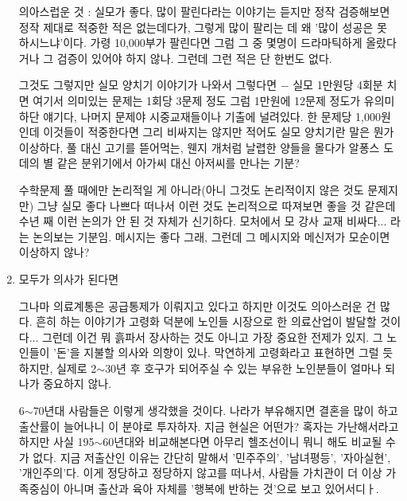 \begin{enumerate}
    의아스럽운 것 : 실모가 좋다, 많이 팔린다라는 이야기는 듣지만
    정작 검증해보면 정작 제대로 적중한 적은 없는데다가, 그렇게 많이 팔리는 데 왜 '많이 성공은 못 하시느냐'이다.
    가령 10,000부가 팔린다면 그럼 그 중 몇명이 드라마틱하게 올랐다거나 그 검증이 있어야 하지 않나. 그런데 그런 적은 단 한번도 없다.
    \vspace{5mm}

    그것도 그렇지만 실모 양치기 이야기가 나와서 그렇다면 $-$ 실모 1만원당 4회분 치면 여기서 의미있는 문제는 1회당 3문제 정도
    그럼 1만원에 12문제 정도가 유의미하단 얘기다, 나머지 문제야 시중교재들이나 기출에 널려있다.
    한 문제당 1,000원인데 이것들이 적중한다면 그리 비싸지는 않지만 적어도 실모 양치기란 말은 뭔가 이상하다,
    풀 대신 고기를 뜯어먹는, 웬지 개처럼 날렵한 양들을 몰다가 알퐁스 도데의 별 같은 분위기에서 아가씨 대신 아저씨를 만나는 기분?
    \vspace{5mm}

    수학문제 풀 때에만 논리적일 게 아니라(아니 그것도 논리적이지 않은 것도 문제지만)
    그냥 실모 좋다 나쁘다 떠나서 이런 것도 논리적으로 따져보면 좋을 것 같은데 수년 째 이런 논의가 안 된 것 자체가 신기하다.
    모처에서 모 강사 교재 비싸다... 라는 논의보는 기분임. 메시지는 좋다 그래, 그런데 그 메시지와 메신저가 모순이면 이상하지 않나?
    \vspace{5mm}

    \item 모두가 의사가 된다면
    \vspace{5mm}

    그나마 의료계통은 공급통제가 이뤄지고 있다고 하지만 이것도 의아스러운 건 많다.
    흔히 하는 이야기가 고령화 덕분에 노인들 시장으로 한 의료산업이 발달할 것이다...
    그런데 이건 뭐 흙파서 장사하는 것도 아니고 가장 중요한 전제가 있지. 그 노인들이 '돈'을 지불할 의사와 의향이 있나.
    막연하게 고령화라고 표현하면 그럴 듯 하지만, 실제로 2$\sim$30년 후 호구가 되어주실 수 있는 부유한 노인분들이 얼마나 되나가 중요하지 않나.
    \vspace{5mm}

    6$\sim$70년대 사람들은 이렇게 생각했을 것이다. 나라가 부유해지면 결혼을 많이 하고 출산률이 늘어나니 이 분야로 투자하자.
    지금 현실은 어떤가? 혹자는 가난해서라고 하지만 사실 195$\sim$60년대와 비교해본다면 아무리 헬조선이니 뭐니 해도 비교될 수가 없다.
    지금 저출산인 이유는 간단히 말해서 '민주주의', '남녀평등', '자아실현', '개인주의'다.
    이게 정당하고 정당하지 않고를 떠나서, 사람들 가치관이 더 이상 가족중심이 아니며 출산과 육아 자체를 '행복에 반하는 것'으로 보고 있어서디ㅏ.
    \vspace{5mm}


\end{enumerate}
